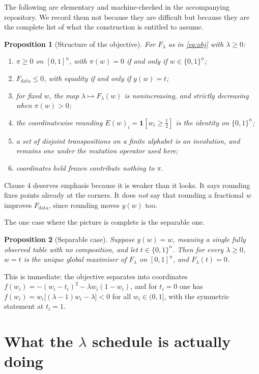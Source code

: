 \documentclass[11pt,a4paper]{article}
\newtheorem{proposition}{Proposition}
\begin{document}
The following are elementary and machine-checked in the accompanying repository.
We record them not because they are difficult but because they are the complete
list of what the construction is entitled to assume.

\begin{proposition}[Structure of the objective]
\label{prop:structure}
For $F_\lambda$ as in \eqref{eq:obj} with $\lambda\ge 0$:
\begin{enumerate}[leftmargin=*,itemsep=1pt]
  \item $\pi\ge 0$ on $[0,1]^n$, with $\pi(w)=0$ if and only if $w\in\{0,1\}^n$;
  \item $F_{\mathrm{data}}\le 0$, with equality if and only if $y(w)=t$;
  \item for fixed $w$, the map $\lambda\mapsto F_\lambda(w)$ is nonincreasing,
        and strictly decreasing when $\pi(w)>0$;
  \item the coordinatewise rounding $E(w)_i=\mathbf{1}[w_i\ge\tfrac12]$ is the
        identity on $\{0,1\}^n$;
  \item a set of disjoint transpositions on a finite alphabet is an involution,
        and remains one under the mutation operator used here;
  \item coordinates held frozen contribute nothing to $\pi$.
\end{enumerate}
\end{proposition}

Clause 4 deserves emphasis because it is weaker than it looks. It says rounding
fixes points already at the corners. It does \emph{not} say that rounding a
fractional $w$ improves $F_{\mathrm{data}}$, since rounding moves $y(w)$ too.

The one case where the picture is complete is the separable one.

\begin{proposition}[Separable case]
\label{prop:separable}
Suppose $y(w)=w$, meaning a single fully observed table with no composition, and
let $t\in\{0,1\}^n$. Then for every $\lambda\ge0$, $w=t$ is the unique global
maximiser of $F_\lambda$ on $[0,1]^n$, and $F_\lambda(t)=0$.
\end{proposition}

This is immediate: the objective separates into coordinates
$f(w_i)=-(w_i-t_i)^2-\lambda w_i(1-w_i)$, and for $t_i=0$ one has
$f(w_i)=w_i\bigl[(\lambda-1)w_i-\lambda\bigr]<0$ for all $w_i\in(0,1]$, with the
symmetric statement at $t_i=1$.

\section{What the $\lambda$ schedule is actually doing}
\end{document}

